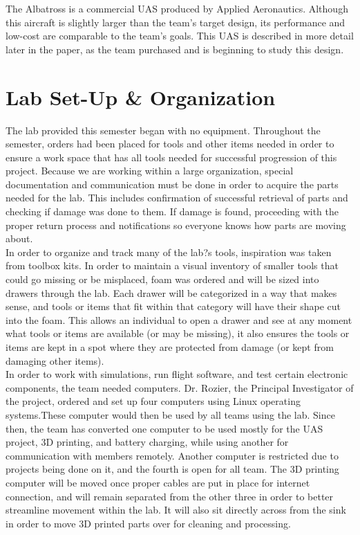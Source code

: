\documentclass{article}
\begin{document}
\noindent The Albatross is a commercial UAS produced by Applied Aeronautics. Although this aircraft is slightly larger than the team's target design, its performance and low-cost are comparable to the team's goals. This UAS is described in more detail later in the paper, as the team purchased and is beginning to study this design. \\


\section{Lab Set-Up \& Organization}
\noindent The lab provided this semester began with no equipment. Throughout the semester, orders had been placed for tools and other items needed in order to ensure a work space that has all tools needed for successful progression of this project. Because we are working within a large organization, special documentation and communication must be done in order to acquire the parts needed for the lab. This includes confirmation of successful retrieval of parts and checking if damage was done to them. If damage is found, proceeding with the proper return process and notifications so everyone knows how parts are moving about. \\

\noindent In order to organize and track many of the lab?s tools, inspiration was taken from toolbox kits. In order to maintain a visual inventory of smaller tools that could go missing or be misplaced, foam was ordered and will be sized into drawers through the lab. Each drawer will be categorized in a way that makes sense, and tools or items that fit within that category will have their shape cut into the foam. This allows an individual to open a drawer and see at any moment what tools or items are available (or may be missing), it also ensures the tools or items are kept in a spot where they are protected from damage (or kept from damaging other items).\\

\noindent In order to work with simulations, run flight software, and test certain electronic components, the team needed computers. Dr. Rozier,  the Principal Investigator of the project, ordered and set up four computers using Linux operating systems.These computer would then be used by all teams using the lab. Since then, the team has converted one computer to be used mostly for the UAS project, 3D printing, and battery charging, while using another for communication with members remotely. Another computer is restricted due to projects being done on it, and the fourth is open for all team. The 3D printing computer will be moved once proper cables are put in place for internet connection, and will remain separated from the other three in order to better streamline movement within the lab. It will also sit directly across from the sink in order to move 3D printed parts over for cleaning and processing. \\
\end{document}
